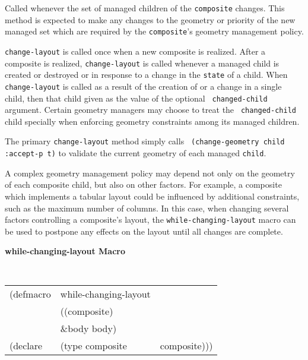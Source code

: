 \begin{flushright} \parbox[t]{6.125in}{
Called whenever the set of managed children of the {\tt composite} changes. This
method is expected to make any changes to the geometry or priority of the new
managed set which are required by the {\tt composite}'s geometry management
policy. 

{\tt change-layout} is called once when a new composite is realized.  After a
composite is realized, {\tt change-layout} is called whenever a managed child is
created or destroyed or in response to a change in the {\tt state} of a child.
When {\tt change-layout} is called as a result of the creation of or a change in
a single child, then that child given as the value of the optional {\tt
changed-child} argument.  Certain geometry managers may choose to treat the {\tt
changed-child} child specially when enforcing geometry constraints among its
managed children.

The primary {\tt change-layout} method simply calls {\tt
(change-geometry child :accept-p t)} to validate the current geometry of each
managed {\tt child}.

}\end{flushright}


A complex geometry management policy may depend not only on the geometry
of each composite child, but also on other factors.  For example, a
composite which implements a tabular layout could be influenced by
additional constraints, such as the maximum number of
columns\footnotemark{}.
In this case, when changing several factors controlling a composite's
layout, the {\tt while-changing-layout} macro can be used to postpone
any effects on the layout until all changes are complete.

{\samepage
{\large {\bf while-changing-layout \hfill Macro}} 
\begin{flushright} \parbox[t]{6.125in}{
\tt
\begin{tabular}{lll}
\raggedright
(defmacro & while-changing-layout & \\ 
& ((composite) \\
& \&body body) \\
(declare &(type composite & composite)))\\
\end{tabular}
\rm

}\end{flushright}}

